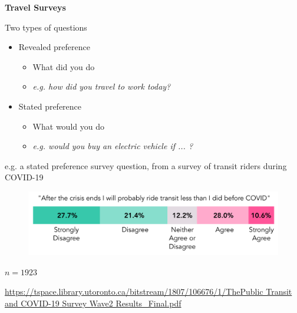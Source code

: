 \documentclass[aspectratio=169]{beamer}
\begin{document}
\begin{frame}
	
	\textbf{Travel Surveys}
	
	\vspace{2mm}

Two types of questions

\vspace{2mm}

	\begin{itemize}
		
		\item Revealed preference
		\begin{itemize}
			\item What did you do
			\item \textit{e.g. how did you travel to work today?}
		\end{itemize}
		
		\item Stated preference
		\begin{itemize}
			\item What would you do
			\item \textit{e.g. would you buy an electric vehicle if ... ?}
		\end{itemize}
		
	\end{itemize}
	
\end{frame}




\begin{frame}
	
	e.g. a stated preference survey question, from a survey of transit riders during COVID-19
	\vspace{2mm}
	
	
	\begin{figure}
		\centering
		\includegraphics[width=1\linewidth]{images/covid_transit_pref}
	\end{figure}
	
	\tiny$n = 1923$
	
	\vspace{2mm}
	
	\tiny\url{https://tspace.library.utoronto.ca/bitstream/1807/106676/1/ThePublic Transit and COVID-19 Survey Wave2 Results_Final.pdf}
	
\end{frame}
\end{document}
